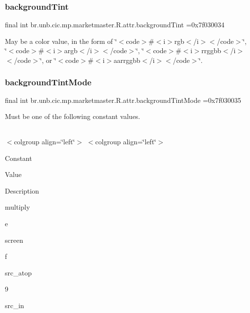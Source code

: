 \subsubsection{\texorpdfstring{background\+Tint}{backgroundTint}}
{\footnotesize\ttfamily final int br.\+unb.\+cic.\+mp.\+marketmaster.\+R.\+attr.\+background\+Tint =0x7f030034\hspace{0.3cm}{\ttfamily [static]}}

May be a color value, in the form of \char`\"{}$<$code$>$\#$<$i$>$rgb$<$/i$>$$<$/code$>$\char`\"{}, \char`\"{}$<$code$>$\#$<$i$>$argb$<$/i$>$$<$/code$>$\char`\"{}, \char`\"{}$<$code$>$\#$<$i$>$rrggbb$<$/i$>$$<$/code$>$\char`\"{}, or \char`\"{}$<$code$>$\#$<$i$>$aarrggbb$<$/i$>$$<$/code$>$\char`\"{}. \mbox{\label{classbr_1_1unb_1_1cic_1_1mp_1_1marketmaster_1_1R_1_1attr_ac30d51b2a0153235091b68ba15d6c436}} 
\subsubsection{\texorpdfstring{background\+Tint\+Mode}{backgroundTintMode}}
{\footnotesize\ttfamily final int br.\+unb.\+cic.\+mp.\+marketmaster.\+R.\+attr.\+background\+Tint\+Mode =0x7f030035\hspace{0.3cm}{\ttfamily [static]}}

Must be one of the following constant values.

\tabulinesep=1mm
\begin{longtabu} spread 0pt [c]{*{0}{|X[-1]}|}
\hline
\end{longtabu}
$<$colgroup align=\char`\"{}left\char`\"{}$>$ $<$colgroup align=\char`\"{}left\char`\"{}$>$ 

Constant

Value

Description 

multiply

e

screen

f

src\+\_\+atop

9

src\+\_\+in

